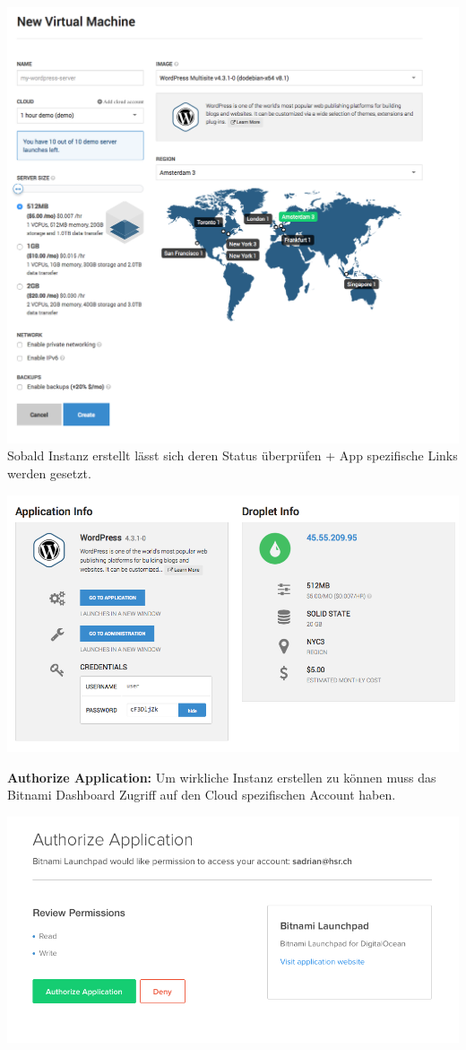 \includegraphics[width=\textwidth]{./03_Analyse/03_Bitnami/images/digitalocean_size}
Sobald Instanz erstellt lässt sich deren Status überprüfen + App spezifische 
Links werden gesetzt.

\includegraphics[width=\textwidth]{./03_Analyse/03_Bitnami/images/digitalocean_infos}

\textbf{Authorize Application:}
Um wirkliche Instanz erstellen zu können muss das Bitnami Dashboard Zugriff auf 
den Cloud spezifischen Account haben.

\includegraphics[width=\textwidth]{./03_Analyse/03_Bitnami/images/digitalocean_authorize}


